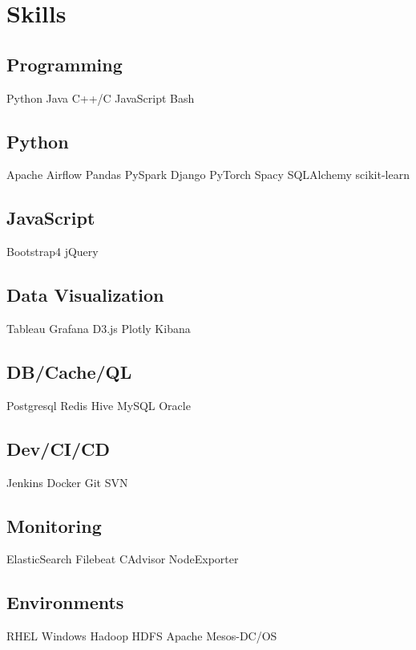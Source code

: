 \documentclass[]{Vishnu-Resume}
\begin{document}
\begin{minipage}[t]{0.33\textwidth}

\section{Skills}
\subsection{Programming}
Python \textbullet{} Java \textbullet{} C++/C  \textbullet{} JavaScript \textbullet{} Bash
\sectionsep

\subsection{Python}
Apache Airflow \textbullet{} Pandas \textbullet{} PySpark  \textbullet{} Django \textbullet{} PyTorch  \textbullet{} Spacy   \textbullet{} SQLAlchemy  \textbullet{} scikit-learn
\sectionsep

\subsection{JavaScript}
Bootstrap4 \textbullet{} jQuery 
\sectionsep

\subsection{Data Visualization}
Tableau \textbullet{} Grafana \textbullet{} D3.js  \textbullet{} Plotly \textbullet{} Kibana
\sectionsep

\subsection{DB/Cache/QL}
 Postgresql  \textbullet{} Redis  \textbullet{} Hive  \textbullet{} MySQL  \textbullet{} Oracle
\sectionsep

\subsection{Dev/CI/CD}
Jenkins \textbullet{} Docker \textbullet{} Git \textbullet{} SVN
\sectionsep


\subsection{Monitoring}
ElasticSearch \textbullet{} Filebeat \textbullet{} CAdvisor \textbullet{} NodeExporter
\sectionsep

\subsection{Environments}
RHEL \textbullet{} Windows  \textbullet{} Hadoop HDFS \textbullet{} Apache Mesos-DC/OS
%
%

\end{minipage} 
\end{document}
